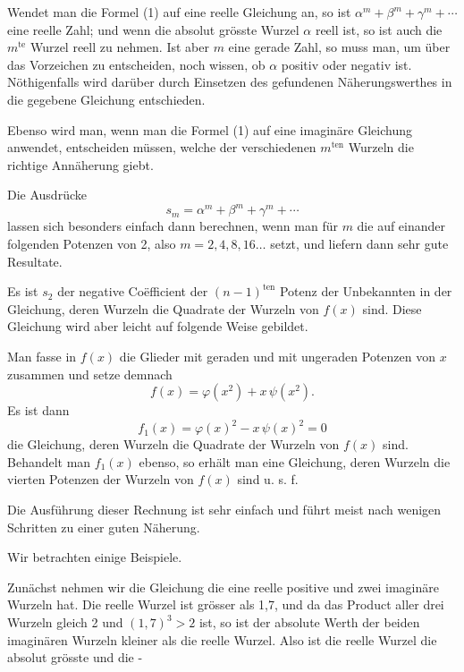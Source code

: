 Wendet man die Formel (1) auf eine reelle Gleichung an, so ist $\alpha^m + \beta^m + \gamma^m + \cdots$ eine reelle Zahl; und wenn die absolut grösste Wurzel $\alpha$ reell ist, so ist auch die $m^{\mathrm{te}}$ Wurzel reell zu nehmen. Ist aber $m$ eine gerade Zahl, so muss man, um über das Vorzeichen zu entscheiden, noch wissen, ob $\alpha$ positiv oder negativ ist. N\"othigenfalls wird darüber durch Einsetzen des gefundenen Näherungswerthes in die gegebene Gleichung entschieden.

Ebenso wird man, wenn man die Formel (1) auf eine imaginäre Gleichung anwendet, entscheiden müssen, welche der verschiedenen $m^{\mathrm{ten}}$ Wurzeln die richtige Annäherung giebt.

Die Ausdrücke
\[
s_m = \alpha^m + \beta^m + \gamma^m + \cdots
\]
lassen sich besonders einfach dann berechnen, wenn man für $m$ die auf einander folgenden Potenzen von 2, also $m = 2, 4, 8, 16 \ldots$ setzt, und liefern dann sehr gute Resultate.

Es ist $s_2$ der negative Co\"efficient der $(n-1)^{\mathrm{ten}}$ Potenz der Unbekannten in der Gleichung, deren Wurzeln die Quadrate der Wurzeln von $f(x)$ sind. Diese Gleichung wird aber leicht auf folgende Weise gebildet.

Man fasse in $f(x)$ die Glieder mit geraden und mit ungeraden Potenzen von $x$ zusammen und setze demnach
\[
f(x) = \varphi(x^2) + x\,\psi(x^2).
\]
Es ist dann
\[
f_1(x) = \varphi(x)^2 - x\,\psi(x)^2 = 0
\]
die Gleichung, deren Wurzeln die Quadrate der Wurzeln von $f(x)$ sind. Behandelt man $f_1(x)$ ebenso, so erhält man eine Gleichung, deren Wurzeln die vierten Potenzen der Wurzeln von $f(x)$ sind u. s. f.

Die Ausführung dieser Rechnung ist sehr einfach und führt meist nach wenigen Schritten zu einer guten Näherung.

Wir betrachten einige Beispiele.

Zunächst nehmen wir die Gleichung
die eine reelle positive und zwei imaginäre Wurzeln hat. Die reelle Wurzel ist grösser als 1,7, und da das Product aller drei Wurzeln gleich 2 und $(1,7)^3 > 2$ ist, so ist der absolute Werth der beiden imaginären Wurzeln kleiner als die reelle Wurzel. Also ist die reelle Wurzel die absolut grösste und die -
